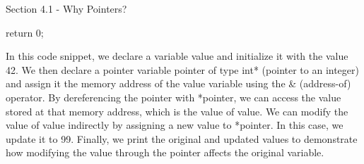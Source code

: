 \begin{notes}{Section 4.1 - Why Pointers?}
\begin{highlight}
\begin{code}[C++]
{        return 0;
    }
    \end{code}
        In this code snippet, we declare a variable value and initialize it with the value 42. We then declare a pointer variable pointer of type int* (pointer to an integer) and assign it the memory address of the value variable using 
        the \& (address-of) operator. By dereferencing the pointer with *pointer, we can access the value stored at that memory address, which is the value of value. We can modify the value of value indirectly by assigning a new value 
        to *pointer. In this case, we update it to 99. Finally, we print the original and updated values to demonstrate how modifying the value through the pointer affects the original variable.
    \end{highlight}
\end{notes}

